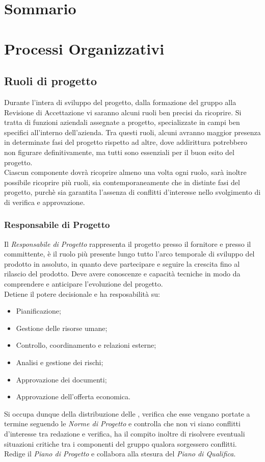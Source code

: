 \documentclass{scalatekids-article}
\begin{document}
\section{Sommario}
\prodPurpose
\glossExpl
\section{Processi Organizzativi}
\subsection{Ruoli di progetto}
Durante l'intera  di sviluppo del progetto, dalla formazione del gruppo alla
Revisione di Accettazione vi saranno alcuni ruoli ben precisi da ricoprire. Si
tratta di funzioni aziendali assegnate a progetto, specializzate in campi ben
specifici all'interno dell'azienda. Tra questi ruoli, alcuni avranno maggior
presenza in determinate fasi del progetto rispetto ad altre, dove addirittura
potrebbero non figurare definitivamente, ma tutti sono essenziali per il buon
esito del progetto.\\ Ciascun componente dovrà ricoprire almeno una volta ogni
ruolo, sarà inoltre possibile ricoprire più ruoli, sia contemporaneamente che in
distinte fasi del progetto, purchè sia garantita l'assenza di conflitti
d'interesse nello svolgimento di  di verifica e approvazione.
\subsubsection{Responsabile di Progetto}
Il \textit{Responsabile di Progetto} rappresenta il progetto presso il fornitore
e presso il committente, è il ruolo più presente lungo tutto l'arco temporale di
sviluppo del prodotto in assoluto, in quanto deve partecipare e seguire la
crescita fino al rilascio del prodotto. Deve avere conoscenze e capacità
tecniche in modo da comprendere e anticipare l'evoluzione del progetto.\\
Detiene il potere decisionale e ha resposabilità su:
\begin{itemize}
\item Pianificazione;
\item Gestione delle risorse umane;
\item Controllo, coordinamento e relazioni esterne;
\item Analisi e gestione dei rischi;
\item Approvazione dei documenti;
\item Approvazione dell'offerta economica.
\end{itemize}
Si occupa dunque della distribuzione delle , verifica che esse vengano
portate a termine seguendo le \textit{Norme di Progetto} e controlla che non vi
siano conflitti d'interesse tra redazione e verifica, ha il compito inoltre di
risolvere eventuali situazioni critiche tra i componenti del gruppo qualora
sorgessero conflitti.\\ Redige il \textit{Piano di Progetto} e collabora alla
stesura del \textit{Piano di Qualifica}.
\end{document}
